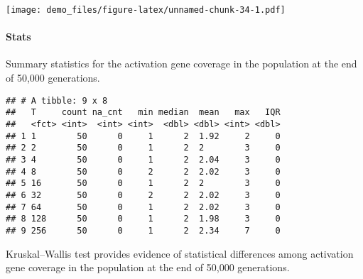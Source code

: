 \documentclass[]{book}
\newenvironment{Shaded}{\begin{snugshade}}{\end{snugshade}}
\newcommand{\DataTypeTok}[1]{\textcolor[rgb]{0.13,0.29,0.53}{#1}}
\newcommand{\KeywordTok}[1]{\textcolor[rgb]{0.13,0.29,0.53}{\textbf{#1}}}
\newcommand{\NormalTok}[1]{#1}
\newcommand{\OperatorTok}[1]{\textcolor[rgb]{0.81,0.36,0.00}{\textbf{#1}}}
\newcommand{\OtherTok}[1]{\textcolor[rgb]{0.56,0.35,0.01}{#1}}
\newcommand{\StringTok}[1]{\textcolor[rgb]{0.31,0.60,0.02}{#1}}
\let\oldparagraph\paragraph
\renewcommand{\paragraph}[1]{\oldparagraph{#1}\mbox{}}
\begin{document}
\texttt{[image: demo\_files/figure-latex/unnamed-chunk-34-1.pdf]}

\hypertarget{stats-24}{%
\paragraph{Stats}\label{stats-24}}

Summary statistics for the activation gene coverage in the population at the end of 50,000 generations.

\begin{Shaded}
\end{Shaded}

\begin{verbatim}
## # A tibble: 9 x 8
##   T     count na_cnt   min median  mean   max   IQR
##   <fct> <int>  <int> <int>  <dbl> <dbl> <int> <dbl>
## 1 1        50      0     1      2  1.92     2     0
## 2 2        50      0     1      2  2        3     0
## 3 4        50      0     1      2  2.04     3     0
## 4 8        50      0     2      2  2.02     3     0
## 5 16       50      0     1      2  2        3     0
## 6 32       50      0     2      2  2.02     3     0
## 7 64       50      0     1      2  2.02     3     0
## 8 128      50      0     1      2  1.98     3     0
## 9 256      50      0     1      2  2.34     7     0
\end{verbatim}

Kruskal--Wallis test provides evidence of statistical differences among activation gene coverage in the population at the end of 50,000 generations.
\end{document}
